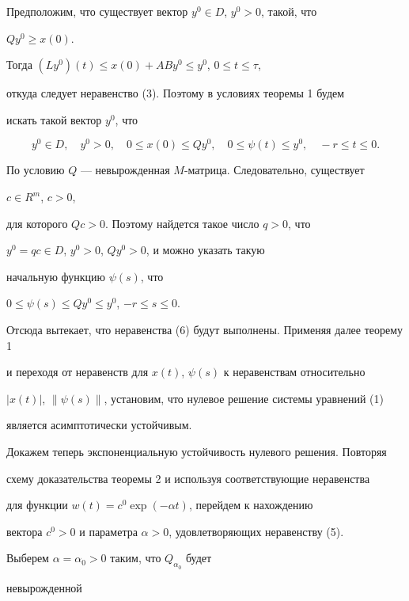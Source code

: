 \begin{pf}


Предположим, что существует вектор $y^0 \in D$, $y^0 > 0$, такой, что


$Qy^0 \ge x(0)$.


Тогда $(Ly^0)(t) \le x(0)+ABy^0 \le y^0$, $0 \le t \le \tau$,


откуда следует неравенство (3). Поэтому в условиях теоремы 1 будем


искать такой вектор $y^0$, что


\begin{equation}


y^0 \in D, \quad y^0 > 0, \quad 0 \le x(0) \le Q y^{0},


\quad 0 \le \psi(t) \le y^0, \quad -r\le t \le 0.


\end{equation}


По условию $Q$ --- невырожденная $M$-матрица. Следовательно, существует


$c \in R^m$, $c>0$,


для которого $Qc > 0$. Поэтому найдется такое число $q>0$, что


$y^0 = qc\in D$, $y^0 > 0$, $Qy^0 >0$, и можно указать такую


начальную функцию $\psi(s)$, что


$0 \le \psi(s) \le Qy^0 \le y^0$, $-r\le s \le 0$.


Отсюда вытекает, что неравенства (6) будут выполнены. Применяя далее теорему 1


и переходя от неравенств для $x(t)$, $\psi (s)$ к неравенствам относительно


$|x(t)|$, $\|\psi(s)\|$, установим, что нулевое решение системы уравнений (1)


является асимптотически устойчивым.





Докажем теперь экспоненциальную устойчивость нулевого решения. Повторяя


схему доказательства теоремы 2 и используя соответствующие неравенства


для функции $w(t)=c^0\exp(-\alpha t)$, перейдем к нахождению


вектора $c^0 > 0$ и параметра $\alpha > 0$, удовлетворяющих неравенству (5).


Выберем $\alpha = \alpha_0 > 0$ таким, что $Q_{\alpha_0}$ будет


невырожденной



\end{pf}
